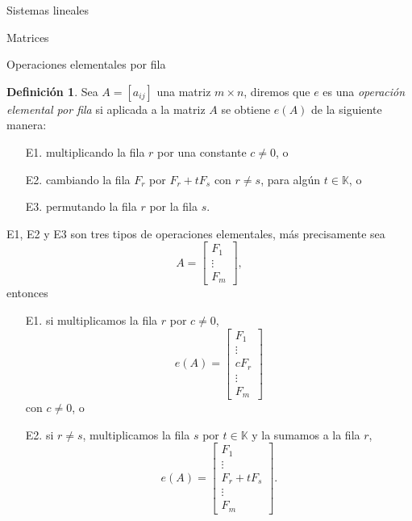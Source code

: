 \documentclass[a4paper,12pt,twoside,spanish,reqno]{amsbook}
\numberwithin{equation}{section}
\theoremstyle{definition}
\newtheorem{definicion}[teorema]{Definici\'on}
\theoremstyle{remark}
\newcommand{\K}{\mathbb K}
\begin{document}
\begin{chapter}{Sistemas lineales}
\begin{section}{Matrices}
\begin{subsection}{Operaciones elementales por fila}
                \begin{definicion}
                    Sea $A = [a_{ij}]$ una matriz $m \times  n$, diremos que $e$ es una  \textit{operación elemental por fila} si aplicada a la matriz $A$ se obtiene  $e(A)$ de la siguiente manera:
                    \begin{enumerate}
                        \item[E1.]\label{elem-1} multiplicando la fila $r$ por una constante $c\not=0$, o
                        \item[E2.]\label{elem-2} cambiando la fila $F_r$ por $F_r + tF_s$ con $r\not=s$, para algún $t \in \K$, o
                        \item[E3.]\label{elem-3} permutando la fila $r$ por la fila $s$.   
                    \end{enumerate}
                    E1, E2 y E3 son tres tipos de operaciones elementales, más precisamente sea 
                    \begin{equation*}
                    A = \begin{bmatrix} 
                    F_1 \\  \vdots \\	F_m
                    \end{bmatrix},
                    \end{equation*} entonces 
                    \begin{enumerate}
                        \item[E1.] si multiplicamos la fila $r$ por $c \not=0$, 
                        $$ e(A) = \begin{bmatrix} 
                        F_1 \\ 	\vdots \\ cF_r \\ \vdots \\	F_m
                        \end{bmatrix} $$ con $c \not=0$, o
                        \item[E2.] si $r\not=s$, multiplicamos la fila $s$ por  $t \in \K$ y la sumamos a la fila $r$, 
                        $$ e(A)= \begin{bmatrix} 
                        F_1 \\  \vdots \\ F_r + t F_s\\ \vdots \\	F_m
                        \end{bmatrix}.$$

\end{enumerate}
\end{definicion}
\end{subsection}
\end{section}
\end{chapter}
\end{document}
